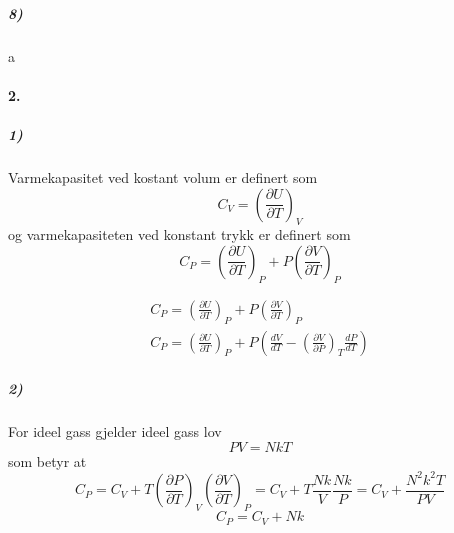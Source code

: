 \documentclass[11pt, A4paper, norsk]{article}
\begin{document}
			\subparagraph{8)}
				\begin{flushleft}
a
				\end{flushleft}











		\paragraph{2.}
			\subparagraph{1)}
				\begin{flushleft}
Varmekapasitet ved kostant volum er definert som
$$C_V = \left( \frac{\partial U}{\partial T} \right)_V$$
og varmekapasiteten ved konstant trykk er definert som
$$C_P = \left( \frac{\partial U}{\partial T} \right)_P + P \left( \frac{\partial V}{\partial T} \right)_P$$
				\end{flushleft}
				\begin{gather*}
C_P = \left( \frac{\partial U}{\partial T} \right)_P + P \left( \frac{\partial V}{\partial T} \right)_P \\
C_P = \left( \frac{\partial U}{\partial T} \right)_P + P \left( \frac{dV}{dT} - \left( \frac{\partial V}{\partial P} \right)_T \frac{dP}{dT} \right)
				\end{gather*}








			\subparagraph{2)}
				\begin{flushleft}
For ideel gass gjelder ideel gass lov
$$PV = NkT$$
som betyr at
$$C_P = C_V + T \left( \frac{\partial P}{\partial T} \right)_V \left( \frac{\partial V}{\partial T} \right)_P = C_V + T \frac{Nk}{V} \frac{Nk}{P} = C_V + \frac{N^2k^2T}{PV}$$
$$C_P = C_V + Nk$$
				\end{flushleft}
\end{document}
